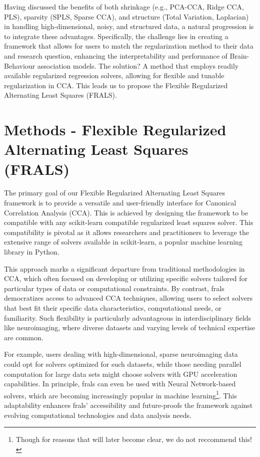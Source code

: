Having discussed the benefits of both shrinkage (e.g., PCA-CCA, Ridge CCA, PLS), sparsity (SPLS, Sparse CCA), and structure (Total Variation, Laplacian) in handling high-dimensional, noisy, and structured data, a natural progression is to integrate these advantages.
Specifically, the challenge lies in creating a framework that allows for users to match the regularization method to their data and research question, enhancing the interpretability and performance of Brain-Behaviour association models.
The solution?
A method that employs readily available regularized regression solvers, allowing for flexible and tunable regularization in CCA.
This leads us to propose the Flexible Regularized Alternating Least Squares (FRALS).

\section{Methods - Flexible Regularized Alternating Least Squares (FRALS)}\label{subsec:flexible-regularized-alternating-least-squares-(frals)}

The primary goal of our Flexible Regularized Alternating Least Squares framework is to provide a versatile and user-friendly interface for Canonical Correlation Analysis (CCA). This is achieved by designing the framework to be compatible with any scikit-learn compatible regularized least squares solver. This compatibility is pivotal as it allows researchers and practitioners to leverage the extensive range of solvers available in scikit-learn, a popular machine learning library in Python.

This approach marks a significant departure from traditional methodologies in CCA, which often focused on developing or utilizing specific solvers tailored for particular types of data or computational constraints.
By contrast, \acrshort{frals} democratizes access to advanced CCA techniques, allowing users to select solvers that best fit their specific data characteristics, computational needs, or familiarity.
Such flexibility is particularly advantageous in interdisciplinary fields like neuroimaging, where diverse datasets and varying levels of technical expertise are common.

For example, users dealing with high-dimensional, sparse neuroimaging data could opt for solvers optimized for such datasets, while those needing parallel computation for large data sets might choose solvers with GPU acceleration capabilities.
In principle, \acrshort{frals} can even be used with Neural Network-based solvers, which are becoming increasingly popular in machine learning\footnote{Though for reasons that will later become clear, we do not reccommend this!}.
This adaptability enhances \acrshort{frals}' accessibility and future-proofs the framework against evolving computational technologies and data analysis needs.


